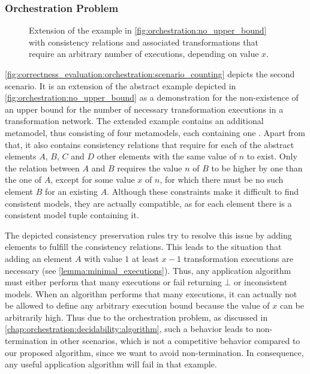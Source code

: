 

\subsubsection*{Orchestration Problem}

\begin{figure}
    \centering
    
    \caption[Example scenario with arbitrary execution bound]{Extension of the example in \autoref{fig:orchestration:no_upper_bound} with consistency relations and associated transformations that require an arbitrary number of executions, depending on value $x$.}
    \label{fig:correctness_evaluation:orchestration:scenario_counting}
\end{figure}

\autoref{fig:correctness_evaluation:orchestration:scenario_counting} depicts the second scenario.
It is an extension of the abstract example depicted in \autoref{fig:orchestration:no_upper_bound} as a demonstration for the non-existence of an upper bound for the number of necessary transformation executions in a transformation network.
The extended example contains an additional metamodel, thus consisting of four metamodels, each containing one \metaclass. 
Apart from that, it also contains consistency relations that require for each of the abstract elements $A$, $B$, $C$ and $D$ other elements with the same value of $n$ to exist.
Only the relation between $A$ and $B$ requires the value $n$ of $B$ to be higher by one than the one of $A$, except for some value $x$ of $n$, for which there must be no such element $B$ for an existing $A$.
Although these constraints make it difficult to find consistent models, they are actually compatible, as for each element there is a consistent model tuple containing it.

The depicted consistency preservation rules try to resolve this issue by adding elements to fulfill the consistency relations.
This leads to the situation that adding an element $A$ with value $1$ at least $x-1$ transformation executions are necessary (see \autoref{lemma:minimal_executions}).
Thus, any application algorithm must either perform that many executions or fail returning $\bot$ or inconsistent models.
When an algorithm performs that many executions, it can actually not be allowed to define any arbitrary execution bound because the value of $x$ can be arbitrarily high.
Thus due to the orchestration problem, as discussed in \autoref{chap:orchestration:decidability:algorithm}, such a behavior leads to non-termination in other scenarios, which is not a competitive behavior compared to our proposed algorithm, since we want to avoid non-termination.
In consequence, any useful application algorithm will fail in that example.

